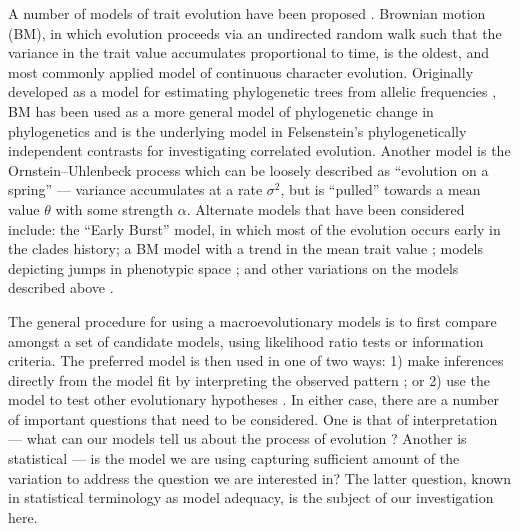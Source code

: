 \documentclass[12pt]{article}
\begin{document}
A number of models of trait evolution have been proposed \citep[see][]{Omeara2012, PennellHarmon}. Brownian motion (BM), in which evolution proceeds via an undirected random walk such that the variance in the trait value accumulates proportional to time, is the oldest, and most commonly applied model of continuous character evolution. Originally developed as a model for estimating phylogenetic trees from allelic frequencies \citep{EC1964}, BM has been used as a more general model of phylogenetic change in phylogenetics \citep{Felsenstein1973, Thompson1975} and is the underlying model in Felsenstein's phylogenetically independent contrasts \citep[PICs;][]{Felsenstein1985} for investigating correlated evolution. Another model is the Ornstein--Uhlenbeck process \citep[OU, or ``Hansen'' model;][]{Felsenstein1988, Hansen1997} which can be loosely described as ``evolution on a spring'' --- variance accumulates at a rate $\sigma^2$, but is ``pulled'' towards a mean value $\theta$ with some strength $\alpha$. Alternate models that have been considered include: the ``Early Burst'' \citep[EB;][]{Blomberg2003, Harmon2010, SlaterPennell} model, in which most of the evolution occurs early in the clades history; a BM model with a trend in the mean trait value \citep{Hunt2006}; models depicting jumps in phenotypic space \citep{Landis2012, Eastmanlevy}; and other variations on the models described above \citep[e.g.][]{Pagel1997, Pagel1999, ButlerKing2004, Omeara2006, Eastman2011, Beaulieu2012, SlaterMEE}.

The general procedure for using a macroevolutionary models is to first compare amongst a set of candidate models, using likelihood ratio tests or information criteria. The preferred model is then used in one of two ways: 1) make inferences directly from the model fit by interpreting the observed pattern \citep[e.g.][]{Harmon2010, Burbrink2012}; or 2) use the model to test other evolutionary hypotheses \citep[e.g.][]{Grafen1989, Freckleton2010}. In either case, there are a number of important questions that need to be considered. One is that of interpretation --- what can our models tell us about the process of evolution \citep{HansenMartins1996, Hansen2012, PennellHarmon}? Another is statistical --- is the model we are using capturing sufficient amount of the variation to address the question we are interested in? The latter question, known in statistical terminology as model adequacy, is the subject of our investigation here.
\end{document}
